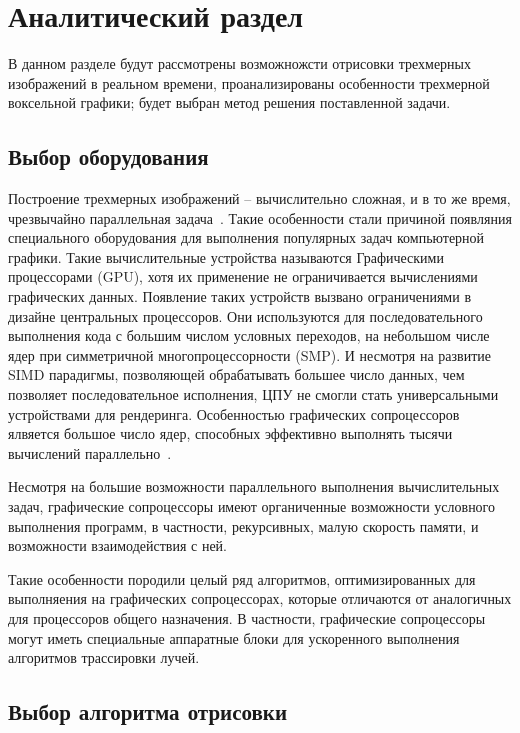 \chapter{Аналитический раздел}

В данном разделе будут рассмотрены возможножсти отрисовки 
трехмерных изображений в реальном времени, проанализированы особенности трехмерной 
воксельной графики; будет выбран метод решения поставленной задачи.

\section{Выбор оборудования}

Построение трехмерных изображений -- вычислительно сложная, и в то же время, чрезвычайно 
параллельная задача~\cite{DaBPP}. Такие особенности стали причиной появляния специального оборудования 
для выполнения популярных задач компьютерной графики. Такие вычислительные устройства
называются Графическими процессорами (GPU), хотя их применение не ограничивается вычислениями
графических данных. Появление таких устройств вызвано ограничениями в дизайне центральных
процессоров. Они используются для последовательного выполнения кода с большим числом условных 
переходов, на небольшом числе ядер при симметричной многопроцессорности (SMP). И несмотря на 
развитие SIMD парадигмы, позволяющей обрабатывать большее число данных, чем позволяет
последовательное исполнения, ЦПУ не смогли стать универсальными устройствами для рендеринга.
Особенностью графических сопроцессоров ялвяется большое число ядер, способных эффективно 
выполнять тысячи вычислений параллельно~\cite{ACLaG}.

Несмотря на большие возможности параллельного выполнения вычислительных задач,
графические сопроцессоры имеют органиченные возможности условного выполнения программ, в 
частности, рекурсивных, малую скорость памяти, и возможности взаимодействия с ней.

Такие особенности породили целый ряд алгоритмов, оптимизированных для выполняения на графических
сопроцессорах, которые отличаются от аналогичных для процессоров общего назначения. В частности, 
графические сопроцессоры могут иметь специальные аппаратные блоки для ускоренного выполнения алгоритмов трассировки лучей. ~\cite{RTiv}

\section{Выбор алгоритма отрисовки}

